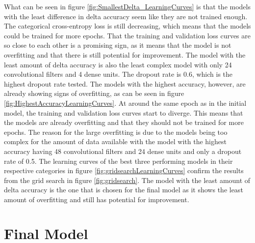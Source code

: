 What can be seen in figure \ref{fig:SmallestDelta_LearningCurves} is that the models with the least difference in delta accuracy seem like they are not trained enough.
The categorical cross-entropy loss is still decreasing, which means that the models could be trained for more epochs.
That the training and validation loss curves are so close to each other is a promising sign, as it means that the model is not overfitting and that there is still potential for improvement.
The model with the least amount of delta accuracy is also the least complex model with only 24 convolutional filters and 4 dense units.
The dropout rate is 0.6, which is the highest dropout rate tested. \newline
The models with the highest accuracy, however, are already showing signs of overfitting, as can be seen in figure \ref{fig:HighestAccuracyLearningCurves}.
At around the same epoch as in the initial model, the training and validation loss curves start to diverge.
This means that the models are already overfitting and that they should not be trained for more epochs.
The reason for the large overfitting is due to the models being too complex for the amount of data available with the model with the highest accuracy having 48 convolutional filters and 24 dense units and only a dropout rate of 0.5.
The learning curves of the best three performing models in their respective categories in figure \ref{fig:gridsearchLearningCurves} confirm the results from the grid search in figure \ref{fig:gridsearch}.
The model with the least amount of delta accuracy is the one that is chosen for the final model as it shows the least amount of overfitting and still has potential for improvement.

\section{Final Model}
\label{sec:finalModel}


